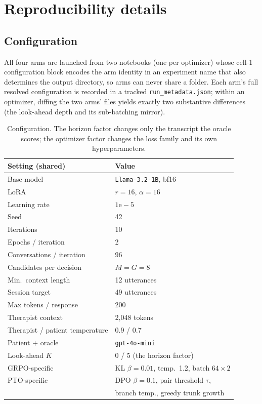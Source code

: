 \section{Reproducibility details}
\label{app:repro}

\subsection{Configuration}

All four arms are launched from two notebooks (one per optimizer) whose cell-1 configuration
block encodes the arm identity in an experiment name that also determines the output directory,
so arms can never share a folder. Each arm's full resolved configuration is recorded in a tracked
\texttt{run\_metadata.json}; within an optimizer, diffing the two arms' files yields exactly two
substantive differences (the look-ahead depth and its sub-batching mirror).

\begin{table}[h]
\centering
\small
\setlength{\tabcolsep}{3pt}
\begin{tabular}{@{}ll@{}}
\toprule
Setting (shared) & Value \\
\midrule
Base model & \texttt{Llama-3.2-1B}, bf16 \\
LoRA & $r{=}16$, $\alpha{=}16$ \\
Learning rate & $1\mathrm{e}{-}5$ \\
Seed & 42 \\
Iterations & 10 \\
Epochs / iteration & 2 \\
Conversations / iteration & 96 \\
Candidates per decision & $M = G = 8$ \\
Min.\ context length & 12 utterances \\
Session target & 49 utterances \\
Max tokens / response & 200 \\
Therapist context & 2{,}048 tokens \\
Therapist / patient temperature & 0.9 / 0.7 \\
Patient + oracle & \texttt{gpt-4o-mini} \\
Look-ahead $K$ & 0 / 5 (the horizon factor) \\
\midrule
GRPO-specific & KL $\beta{=}0.01$, temp.\ 1.2, batch $64 \times 2$ \\
PTO-specific & DPO $\beta{=}0.1$, pair threshold $\tau$, \\
             & branch temp., greedy trunk growth \\
\bottomrule
\end{tabular}
\caption{Configuration. The horizon factor changes only the transcript the oracle scores; the
optimizer factor changes the loss family and its own hyperparameters.}
\end{table}

